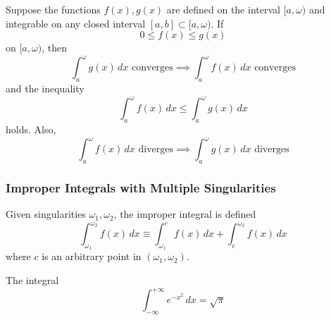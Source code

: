     \begin{theorem}
    Suppose the functions $f(x), g(x)$ are defined on the interval $[a, \omega)$ and integrable on any closed interval $[a, b] \subset [a, \omega)$. If 
    \[0 \leq f(x) \leq g(x)\]
    on $[a, \omega)$, then 
    \[\int_a^\omega g(x)\,dx \text{ converges} \implies \int_a^\omega f(x)\,dx \text{ converges}\]
    and the inequality 
    \[\int_a^\omega f(x)\,dx \leq \int_a^\omega g(x)\,dx\]
    holds. Also, 
    \[\int_a^\omega f(x)\,dx \text{ diverges} \implies \int_a^\omega g(x)\,dx \text{ diverges}\]
    \end{theorem}
  
  \subsubsection{Improper Integrals with Multiple Singularities}

    \begin{definition}
      Given singularities $\omega_1, \omega_2$, the improper integral is defined
      \[\int_{\omega_1}^{\omega_2} f(x)\,dx \equiv \int_{\omega_1}^c f(x)\,dx + \int_c^{\omega_2} f(x)\,dx\]
      where $c$ is an arbitrary point in $(\omega_1, \omega_2)$. 
    \end{definition}

  \begin{example}
  The integral 
  \[\int_{-\infty}^{+\infty} e^{-x^2}\,dx = \sqrt{\pi}\]
  \end{example}

